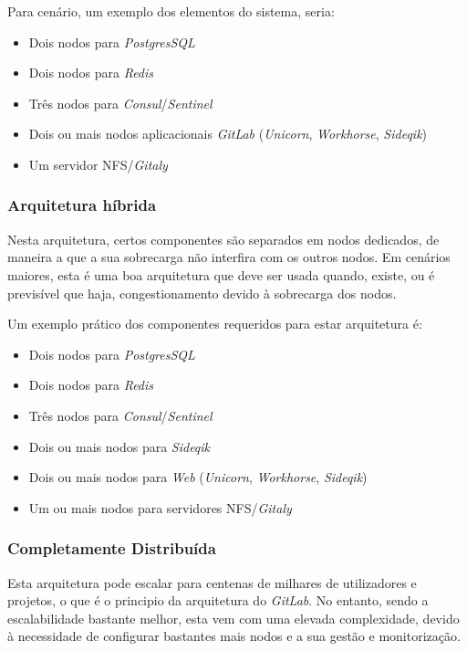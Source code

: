 \documentclass[12pt,a4paper]{article}
\begin{document}
Para cenário, um exemplo dos elementos do sistema, seria:

\begin{itemize}
    \item Dois nodos para \emph{PostgresSQL}
    \item Dois nodos para \emph{Redis}
    \item Três nodos para \emph{Consul}/\emph{Sentinel}
    \item Dois ou mais nodos aplicacionais \emph{GitLab} (\emph{Unicorn}, \emph{Workhorse}, \emph{Sideqik})
    \item Um servidor NFS/\emph{Gitaly}
\end{itemize}

\subsubsection{Arquitetura híbrida}

Nesta arquitetura, certos componentes são separados em nodos dedicados, de maneira a que a sua sobrecarga não interfira com os outros nodos. Em cenários maiores, esta é uma boa arquitetura que deve ser usada quando, existe, ou é previsível que haja, congestionamento devido à sobrecarga dos nodos.

Um exemplo prático dos componentes requeridos para estar arquitetura é:

\begin{itemize}
    \item Dois nodos para \emph{PostgresSQL}
    \item Dois nodos para \emph{Redis}
    \item Três nodos para \emph{Consul}/\emph{Sentinel}
    \item Dois ou mais nodos para \emph{Sideqik}
    \item Dois ou mais nodos para \emph{Web} (\emph{Unicorn}, \emph{Workhorse}, \emph{Sideqik})
    \item Um ou mais nodos para servidores NFS/\emph{Gitaly}
\end{itemize}

\subsubsection{Completamente Distribuída}

Esta arquitetura pode escalar para centenas de milhares de utilizadores e projetos, o que é o principio da arquitetura do \emph{GitLab}. No entanto, sendo a escalabilidade bastante melhor, esta vem com uma elevada complexidade, devido à necessidade de configurar bastantes mais nodos e a sua gestão e monitorização.
\end{document}
